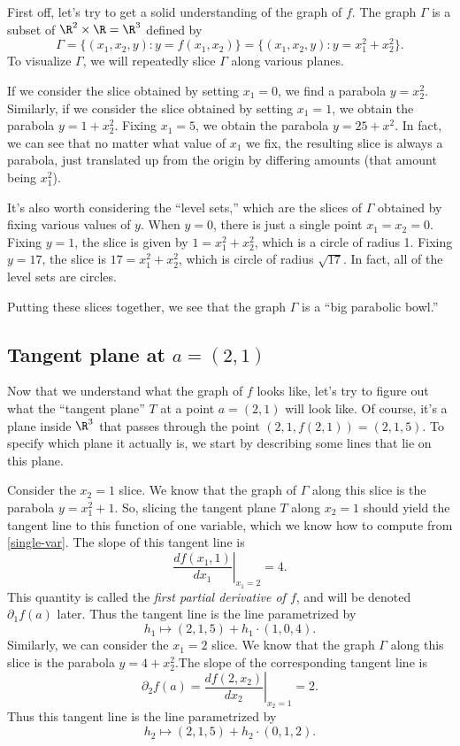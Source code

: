 First off, let's try to get a solid understanding of the graph of $f$. The graph $\Gamma$ is a subset of $\R^2 \times \R = \R^3$ defined by
\[ \Gamma = \{ (x_1, x_2, y) : y = f(x_1, x_2) \} = \{ (x_1, x_2, y) : y = x_1^2  + x_2^2 \}. \]
To visualize $\Gamma$, we will repeatedly slice $\Gamma$ along various planes. 

If we consider the slice obtained by setting $x_1 = 0$, we find a parabola $y = x_2^2$. Similarly, if we consider the slice obtained by setting $x_1 = 1$, we obtain the parabola $y = 1 + x_2^2$. Fixing $x_1 = 5$, we obtain the parabola $y = 25 + x^2$. In fact, we can see that no matter what value of $x_1$ we fix, the resulting slice is always a parabola, just translated up from the origin by differing amounts (that amount being $x_1^2$). 

It's also worth considering the ``level sets,'' which are the slices of $\Gamma$ obtained by fixing various values of $y$. When $y = 0$, there is just a single point $x_1 = x_2 = 0$. Fixing $y = 1$, the slice is given by $1 = x_1^2 +  x_2^2$, which is a circle of radius 1. Fixing $y = 17$, the slice is $17 = x_1^2 + x_2^2$, which is circle of radius $\sqrt{17}$. In fact, all of the level sets are circles. 

Putting these slices together, we see that the graph $\Gamma$ is a ``big parabolic bowl.''

\subsection*{Tangent plane at \texorpdfstring{$a = (2,1)$}{a = (2,1)}}

Now that we understand what the graph of $f$ looks like, let's try to figure out what the ``tangent plane'' $T$ at a point $a = (2,1)$ will look like. Of course, it's a plane inside $\R^3$ that passes through the point $(2, 1, f(2,1)) = (2, 1, 5)$. To specify which plane it actually is, we start by describing some lines that lie on this plane. 

Consider the $x_2 = 1$ slice. We know that the graph of $\Gamma$ along this slice is the parabola $y = x_1^2 + 1$. So, slicing the tangent plane $T$ along $x_2 = 1$ should yield the tangent line to this function of one variable, which we know how to compute from \cref{single-var}. The slope of this tangent line is
\[ \left.\frac{d f(x_1, 1)}{d x_1}\right|_{x_1 = 2} = 4. \]
This quantity is called the \emph{first partial derivative of $f$}, and will be denoted $\partial_1 f(a)$ later.  Thus the tangent line is the line parametrized by
\[ h_1 \mapsto (2,1,5) + h_1 \cdot (1, 0, 4). \]
Similarly, we can consider the $x_1 = 2$ slice. We know that the graph $\Gamma$ along this slice is the parabola $y = 4 + x_2^2$.The slope of the corresponding tangent line is
\[ \partial_2 f(a) = \left.\frac{d f(2, x_2)}{dx_2}\right|_{x_2 = 1} = 2. \]
Thus this tangent line is the line parametrized by
\[ h_2 \mapsto (2,1,5) + h_2 \cdot (0,1,2). \]

